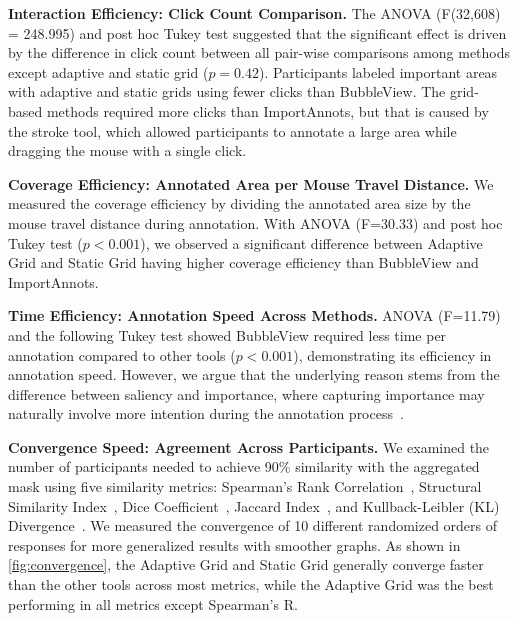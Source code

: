 
\noindent\textbf{Interaction Efficiency: Click Count Comparison.}
The ANOVA (F(32,608) = 248.995) and post hoc Tukey test suggested that the significant effect is driven by the difference in click count between all pair-wise comparisons among methods except adaptive and static grid ($p = 0.42$). Participants labeled important areas with adaptive and static grids using fewer clicks than BubbleView. The grid-based methods required more clicks than ImportAnnots, but that is caused by the stroke tool, which allowed participants to annotate a large area while dragging the mouse with a single click. 

\noindent\textbf{Coverage Efficiency: Annotated Area per Mouse Travel Distance.}
We measured the coverage efficiency by dividing the annotated area size by the mouse travel distance during annotation. With ANOVA (F=30.33) and post hoc Tukey test ($p<0.001$), we observed a significant difference between Adaptive Grid and Static Grid having higher coverage efficiency than BubbleView and ImportAnnots.  


\noindent\textbf{Time Efficiency: Annotation Speed Across Methods.}
ANOVA (F=11.79) and the following Tukey test showed BubbleView required less time per annotation compared to other tools ($p<0.001$), demonstrating its efficiency in annotation speed. However, we argue that the underlying reason stems from the difference between saliency and importance, where capturing importance may naturally involve more intention during the annotation process~\cite{turkeyes}.

\noindent\textbf{Convergence Speed: Agreement Across Participants.}
We examined the number of participants needed to achieve 90\% similarity with the aggregated mask using five similarity metrics: Spearman’s Rank Correlation~\cite{spearman}, Structural Similarity Index~\cite{ssim}, Dice Coefficient~\cite{dice}, Jaccard Index~\cite{jaccard}, and Kullback-Leibler (KL) Divergence~\cite{kldivergence}. We measured the convergence of 10 different randomized orders of responses for more generalized results with smoother graphs. As shown in \autoref{fig:convergence}, the Adaptive Grid and Static Grid generally converge faster than the other tools across most metrics, while the Adaptive Grid was the best performing in all metrics except Spearman's R.
